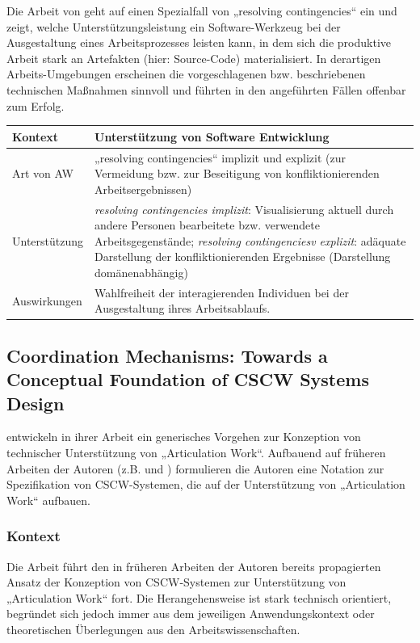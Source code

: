 Die Arbeit von \citet{Grinter96} geht auf einen Spezialfall von „resolving contingencies“ ein und zeigt, welche Unterstützungsleistung ein Software-Werkzeug bei der Ausgestaltung eines Arbeitsprozesses leisten kann, in dem sich die produktive Arbeit stark an Artefakten (hier: Source-Code) materialisiert. In derartigen Arbeits-Umgebungen erscheinen die vorgeschlagenen bzw. beschriebenen technischen Maßnahmen sinnvoll und führten in den angeführten Fällen offenbar zum Erfolg.
\\[1em]
\begin{tabular}{| p{3cm} | p{10cm} |}
  \hline
  Kontext & Unterstützung von Software Entwicklung \\ \hline
  Art von AW & „resolving contingencies“ implizit und explizit (zur Vermeidung bzw. zur Beseitigung von konfliktionierenden Arbeitsergebnissen) \\ \hline
  Unterstützung & \emph{resolving contingencies implizit}: Visualisierung aktuell durch andere Personen bearbeitete bzw. verwendete Arbeitsgegenstände; \emph{resolving contingenciesv explizit}: adäquate Darstellung der konfliktionierenden Ergebnisse (Darstellung domänenabhängig) \\ \hline
  Auswirkungen & Wahlfreiheit der interagierenden Individuen bei der Ausgestaltung ihres Arbeitsablaufs.\\ \hline
\end{tabular}

\subsection{Coordination Mechanisms: Towards a Conceptual Foundation of CSCW Systems Design}

\citet{Schmidt96} entwickeln in ihrer Arbeit ein generisches Vorgehen zur Konzeption von technischer Unterstützung von „Articulation Work“. Aufbauend auf früheren Arbeiten der Autoren (z.B. \citep{Schmidt90} und \citep{Schmidt92}) formulieren die Autoren eine Notation zur Spezifikation von \gls{CSCW}-Systemen, die auf der Unterstützung von „Articulation Work“ aufbauen.

\subsubsection{Kontext}

Die Arbeit führt den in früheren Arbeiten der Autoren bereits propagierten Ansatz der Konzeption von \gls{CSCW}-Systemen zur Unterstützung von „Articulation Work“ fort. Die Herangehensweise ist stark technisch orientiert, begründet sich jedoch immer aus dem jeweiligen Anwendungskontext oder theoretischen Überlegungen aus den Arbeitswissenschaften.

